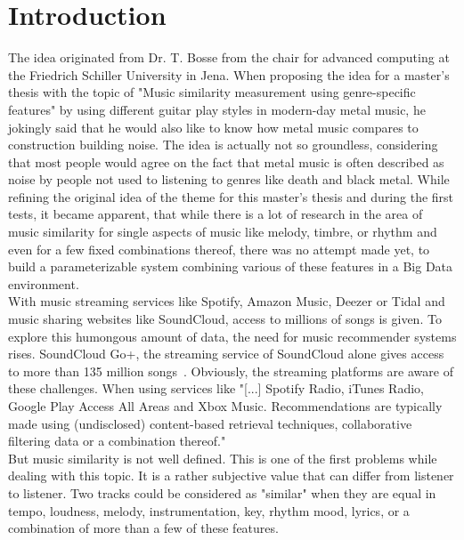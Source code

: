 \chapter{Introduction}\label{intro}

The idea originated from Dr. T. Bosse from the chair for advanced computing at the Friedrich Schiller University in Jena. When proposing the idea for a master's thesis with the topic of "Music similarity measurement using genre-specific features" by using different guitar play styles in modern-day metal music, he jokingly said that he would also like to know how metal music compares to construction building noise. The idea is actually not so groundless, considering that most people would agree on the fact that metal music is often described as noise by people not used to listening to genres like death and black metal.
While refining the original idea of the theme for this master's thesis and during the first tests, it became apparent, that while there is a lot of research in the area of music similarity for single aspects of music like melody, timbre, or rhythm and even for a few fixed combinations thereof, there was no attempt made yet, to build a parameterizable system combining various of these features in a Big Data environment.\\
With music streaming services like Spotify, Amazon Music, Deezer or Tidal and music sharing websites like SoundCloud, access to millions of songs is given. To explore this humongous amount of data, the need for music recommender systems rises. SoundCloud Go+, the streaming service of SoundCloud alone gives access to more than 135 million songs~\cite{soundcloudgo}. 
Obviously, the streaming platforms are aware of these challenges. When using services like "[...] Spotify Radio, iTunes Radio, Google Play Access All Areas and Xbox Music. Recommendations are typically made using (undisclosed) content-based retrieval techniques, collaborative filtering data or a combination thereof."~\cite[p. 9]{knees1}\\
But music similarity is not well defined. This is one of the first problems while dealing with this topic. It is a rather subjective value that can differ from listener to listener. Two tracks could be considered as "similar" when they are equal in tempo, loudness, melody, instrumentation, key, rhythm mood, lyrics, or a combination of more than a few of these features.\\
\ \\

